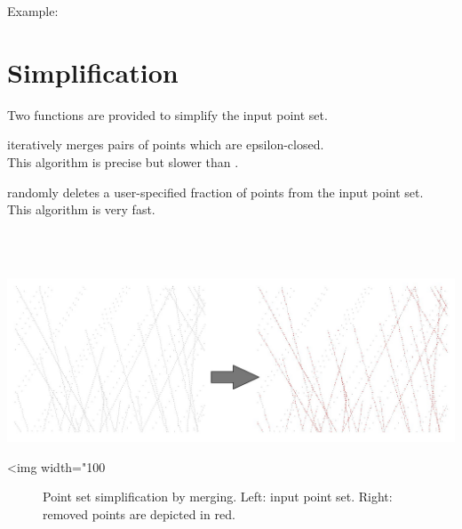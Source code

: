 Example:



\section{Simplification}

Two functions are provided to simplify the input point set.

 iteratively merges pairs of points which are epsilon-closed.\\
This algorithm is precise but slower than .

 randomly deletes a user-specified fraction of points from the input point set.\\
This algorithm is very fast.

  \\
  \\

\begin{center}
    \label{Point_set_processing_3-fig-merge_simplification}
    \begin{ccTexOnly}
        \includegraphics[width=1.0\textwidth]{Point_set_processing_3/merge_simplification} %
    \end{ccTexOnly}
    \begin{ccHtmlOnly}
        <img width="100%
    \end{ccHtmlOnly}
    \begin{figure}[h]
        \caption{Point set simplification by merging.
                 Left: input point set.
                 Right: removed points are depicted in red.}
    \end{figure}
\end{center}

